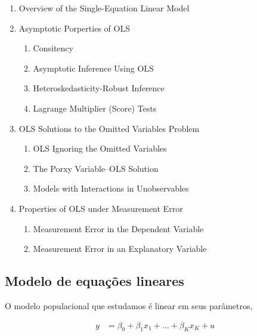 \documentclass[11pt, oneside, a4paper, article]{article}
\numberwithin{equation}{section}
\begin{document}
\begin{enumerate}[noitemsep, label*=4.\arabic*]
\item  Overview of the Single-Equation Linear Model

\item  Asymptotic Porperties of OLS
	\begin{enumerate}[noitemsep, leftmargin=1 em, label*=.\arabic*.]
\item Consitency
\item Asymptotic Inference Using OLS
\item Heteroskedasticity-Robust Inference
\item Lagrange Multiplier (Score) Tests
\end{enumerate}

\item  OLS Solutions to the Omitted Variables Problem
\begin{enumerate}[noitemsep, leftmargin=1 em, label*=\arabic*.]
\item OLS Ignoring the Omitted Variables
\item The Porxy Variable--OLS Solution
\item Models with Interactions in Unobservables
\end{enumerate}

\item  Properties of OLS under Measurement Error
\begin{enumerate}[noitemsep, leftmargin=1 em, label*=\arabic*.]
\item Measurement Error in the Dependent Variable
\item Measurement Error in an Explanatory Variable
\end{enumerate}
\end{enumerate}

\subsection{Modelo de equações lineares} 
\noindent
\citet[Sec. 4.1 -- Overview of the Single-Equation Linear Model; p.49]{wool-2010}

O modelo populacional que estudamos é linear em seus parâmetros,

\vspace{-1 em}
\begin{align} \label{ols:mod}
y &= \beta_{0} + \beta_{1} x_{1} + \dots + \beta_{K} x_{K} + u
\end{align}
\vspace{-1 em}
\end{document}
